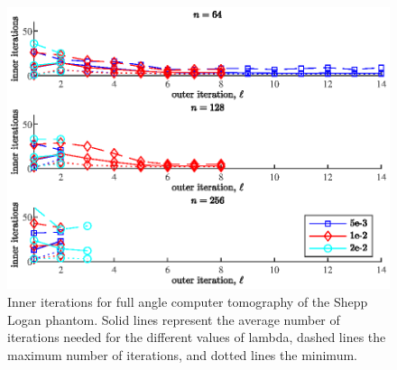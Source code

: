 \begin{figure}[htbp]
\begin{center}
\includegraphics{figures/full_angle_inner_its}
\caption{Inner iterations for full angle computer tomography of the Shepp Logan phantom.  Solid lines represent the average number of iterations needed for the different values of lambda, dashed lines the maximum number of iterations, and dotted lines the minimum.}
\label{fig:full_angle_inner_its}
\end{center}
\end{figure}%
